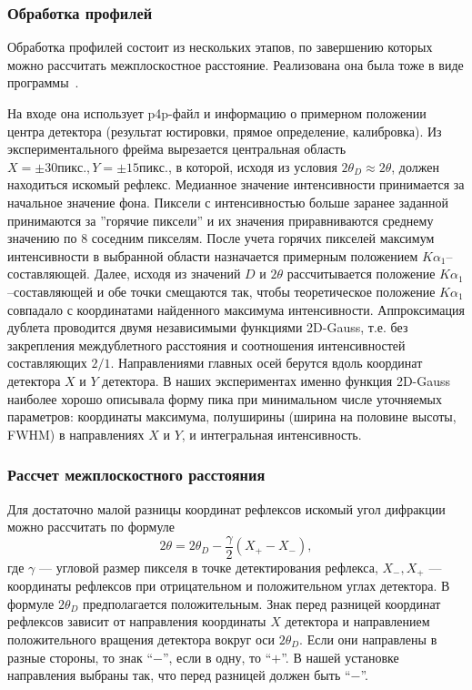 \subsubsection{Обработка профилей}
Обработка профилей состоит из нескольких этапов, по завершению которых можно рассчитать межплоскостное расстояние.
Реализована она была тоже в виде программы~\cite{Kudryavtsev:2024:eccentr}.

На входе она использует p4p-файл и информацию о примерном положении центра детектора (результат юстировки, прямое определение, калибровка).
Из экспериментального фрейма вырезается центральная область $X = \pm 30\unit{пикс.}, Y = \pm 15\unit{пикс.}$, в которой, исходя из условия $2\theta_D \approx 2\theta$, должен находиться искомый рефлекс.
Медианное значение интенсивности принимается за начальное значение фона.
Пиксели с интенсивностью больше заранее заданной принимаются за ''горячие пиксели'' и их значения приравниваются среднему значению по 8 соседним пикселям.
После учета горячих пикселей максимум интенсивности в выбранной области назначается примерным положением $K\alpha_1$--составляющей.
Далее, исходя из значений $D$ и $2\theta$ рассчитывается положение $K\alpha_1$--составляющей и обе точки смещаются так, чтобы теоретическое положение $K\alpha_1$ совпадало с координатами найденного максимума интенсивности.
Аппроксимация дублета проводится двумя независимыми  функциями 2D-Gauss, т.е. без закрепления междублетного расстояния и соотношения интенсивностей составляющих $2/1$.
Направлениями главных осей берутся вдоль координат детектора $X$ и $Y$ детектора.
В наших экспериментах именно функция 2D-Gauss наиболее хорошо описывала форму пика при минимальном числе уточняемых параметров: координаты максимума, полуширины (ширина на половине высоты, FWHM) в направлениях $X$ и $Y$, и интегральная интенсивность.

\subsubsection{Рассчет межплоскостного расстояния}
Для достаточно малой разницы координат рефлексов искомый угол дифракции можно рассчитать по формуле
\begin{equation} \label{eq:bond2}
    2\theta = 2\theta_D - \frac{\gamma}{2} (X_{+} - X_{-}),
\end{equation}
где $\gamma$ --- угловой размер пикселя в точке детектирования рефлекса, $X_{-}, X_{+}$ --- координаты рефлексов при отрицательном и положительном углах детектора.
В формуле $2\theta_D$ предполагается положительным.
Знак перед разницей координат рефлексов зависит от направления координаты $X$ детектора и направлением положительного вращения детектора вокруг оси $2\theta_D$.
Если они направлены в разные стороны, то знак ``$-$'', если в одну, то ``$+$''.
В нашей установке направления выбраны так, что перед разницей должен быть ``$-$''.
